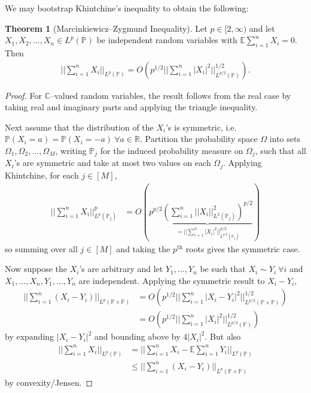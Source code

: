 \documentclass{article}
\theoremstyle{definition}
\newtheorem{theorem}{Theorem}[section]
\begin{document}
We may bootstrap Khintchine's inequality to obtain the following:
\begin{theorem}[Marcinkiewicz--Zygmund Inequality]
    Let $p \in [2,\infty)$ and let $X_1,X_2,\ldots,X_n \in L^p(\mathbb{P})$ be independent random variables with $\mathbb{E}\sum_{i=1}^{n} X_i = 0$. Then 
    \begin{align*}
        ||\sum_{i=1}^{n} X_i||_{L^p(\mathbb{P})} = O \left(p^{1/2}||\sum_{i=1}^{n} \left|X_i\right|^2||_{L^{p/2}(\mathbb{P})}^{1/2}\right).
    \end{align*}
\end{theorem}
\begin{proof}
    For $\mathbb{C}$--valued random variables, the result follows from the real case by taking real and imaginary parts and applying the triangle inequality. 
    \vspace{1mm}
     
    Next assume that the distribution of the $X_i$'s is symmetric, i.e. $\mathbb{P}\left(X_i=a\right)=\mathbb{P}\left(X_i=-a\right) ~\forall a \in \mathbb{R}$. Partition the probability space $\Omega$ into sets $\Omega_1,\Omega_2,\ldots,\Omega_M$, writing $\mathbb{P}_j$ for the induced probability measure on $\Omega_j$, such that all $X_i$'s are symmetric and take at most two values on each $\Omega_j$. Applying Khintchine, for each $j \in [M]$, 
    \begin{align*}
        ||\sum_{i=1}^{n} X_i||_{L^p(\mathbb{P}_j)}^{p} &= O (p^{p/2} \underbrace{\left(\sum_{i=1}^{n} ||X_i||^2_{L^2(\mathbb{P}_j)}\right)^{p/2}}_{= ||\sum_{i=1}^{n} \left|X_i\right|^2 ||_{L^{p/2}(\mathbb{P}_j)}^{p/2}})
    \end{align*}
    so summing over all $j \in [M]$ and taking the $p^{\text{th}}$ roots gives the symmetric case.

    \vspace{1mm}
     
    Now suppose the $X_i$'s are arbitrary and let $Y_1,\ldots,Y_n$ be such that $X_i \sim Y_i ~\forall i$ and $X_1,\ldots,X_n,Y_1,\ldots,Y_n$ are independent. Applying the symmetric result to $X_i-Y_i$,
    \begin{align*}
        ||\sum_{i=1}^{n} (X_i-Y_i)||_{L^p(\mathbb{P} \times \mathbb{P})} &= O \left(p^{1/2} ||\sum_{i=1}^{n} \left|X_i-Y_i\right|^2||_{L^{p/2}(\mathbb{P} \times \mathbb{P})}^{1/2}\right) \\
        &= O \left(p^{1/2} ||\sum_{i=1}^{n} \left|X_i\right|^2||_{L^{p/2}(\mathbb{P})}^{1/2} \right)
    \end{align*}
    by expanding $\left|X_i-Y_i\right|^2$ and bounding above by $4\left|X_i\right|^2$. But also 
    \begin{align*}
        ||\sum_{i=1}^{n} X_i||_{L^p(\mathbb{P})} &= ||\sum_{i=1}^{n} X_i - \mathbb{E} \sum_{i=1}^{n} Y_i||_{L^p(\mathbb{P})} \\
        &\le ||\sum_{i=1}^{n} (X_i-Y_i)||_{L^p(\mathbb{P} \times \mathbb{P})}
    \end{align*}
    by convexity/Jensen.
\end{proof}
\end{document}
